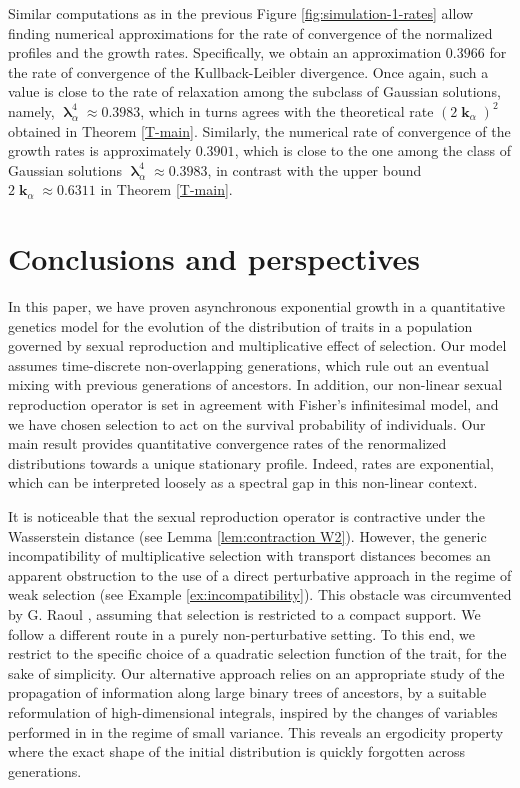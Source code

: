 \documentclass[reqno]{amsart}
\DeclareMathOperator{\blambda}{\boldsymbol{\lambda}}
\DeclareMathOperator{\bk}{\boldsymbol{k}}
\numberwithin{equation}{section}
\begin{document}
{Similar computations as in the previous Figure \ref{fig:simulation-1-rates} allow finding numerical approximations for the rate of convergence of the normalized profiles and the growth rates. Specifically, we obtain an approximation $0.3966$ for the rate of convergence of the Kullback-Leibler divergence. Once again, such a value is close to the rate of relaxation among the subclass of Gaussian solutions, namely, $\blambda_\alpha^4\approx 0.3983$, which in turns agrees with the theoretical rate $(2\bk_\alpha)^2$ obtained in Theorem \ref{T-main}. Similarly, the numerical rate of convergence of the growth rates is approximately $0.3901$, which is close to the one among the class of Gaussian solutions $\blambda_\alpha^4\approx 0.3983$, in contrast with the upper bound $2\bk_\alpha\approx 0.6311$ in Theorem \ref{T-main}.

\section{Conclusions and perspectives}\label{S-conclusions}

In this paper, we have proven asynchronous exponential growth in a quantitative genetics model for the evolution of the distribution of traits in a population governed by sexual reproduction and multiplicative effect of selection. Our model assumes time-discrete non-overlapping generations, which rule out an eventual mixing with previous generations of ancestors. In addition, our non-linear sexual reproduction operator is set in agreement with Fisher's infinitesimal model, and we have chosen selection to act on the survival probability of individuals. Our main result provides quantitative convergence rates of the renormalized distributions towards a unique stationary profile. Indeed, rates are exponential, which can be interpreted loosely as a spectral gap in this non-linear context.

It is noticeable that the sexual reproduction operator is contractive under the Wasserstein distance (see Lemma \ref{lem:contraction W2}).
However, the generic incompatibility of multiplicative selection with transport distances  becomes an apparent obstruction to the use of a direct perturbative approach in the regime of weak selection (see Example \ref{ex:incompatibility}). This obstacle was circumvented by {\sc G. Raoul} \cite{R-21-arxiv}, assuming that selection is restricted to a compact support. We follow a different route in a purely non-perturbative setting. To this end, we restrict to the specific choice of a quadratic selection  function of the trait, for the sake of simplicity. Our alternative approach relies on an appropriate study of the propagation of information along large binary trees of ancestors, by a suitable reformulation of high-dimensional integrals, inspired by the changes of variables performed in \cite{CGP-19} in the regime of small variance. This reveals an ergodicity property where the exact shape of the initial distribution is quickly forgotten across generations. 

}
\end{document}
